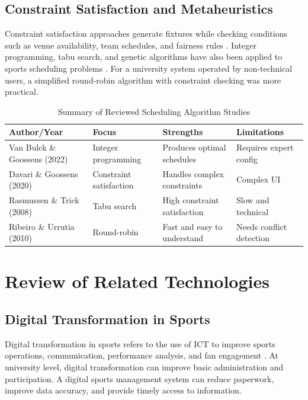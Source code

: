 \documentclass[12pt,a4paper]{report}
\begin{document}
\subsection{Constraint Satisfaction and Metaheuristics}
Constraint satisfaction approaches generate fixtures while checking conditions such as venue
availability, team schedules, and fairness rules \cite{davari2020}. Integer programming,
tabu search, and genetic algorithms have also been applied to sports scheduling problems
\cite{vanbulck2022,rasmussen2008}. For a university system operated by non-technical users,
a simplified round-robin algorithm with constraint checking was more practical.

\begin{table}[H]
\centering
\caption{Summary of Reviewed Scheduling Algorithm Studies}
\begin{tabular}{p{3.5cm}p{3cm}p{4cm}p{3cm}}
\toprule
\textbf{Author/Year} & \textbf{Focus} & \textbf{Strengths} & \textbf{Limitations}\\
\midrule
Van Bulck \& Goossens (2022) & Integer programming & Produces optimal schedules & Requires expert config\\
Davari \& Goossens (2020) & Constraint satisfaction & Handles complex constraints & Complex UI\\
Rasmussen \& Trick (2008) \cite{rasmussen2008} & Tabu search & High constraint satisfaction & Slow and technical\\
Ribeiro \& Urrutia (2010) & Round-robin & Fast and easy to understand & Needs conflict detection\\
\bottomrule
\end{tabular}
\end{table}

\section{Review of Related Technologies}

\subsection{Digital Transformation in Sports}
Digital transformation in sports refers to the use of ICT to improve sports operations,
communication, performance analysis, and fan engagement \cite{fonti2023}. At university level,
digital transformation can improve basic administration and participation. A digital sports
management system can reduce paperwork, improve data accuracy, and provide timely access to
information.
\end{document}
